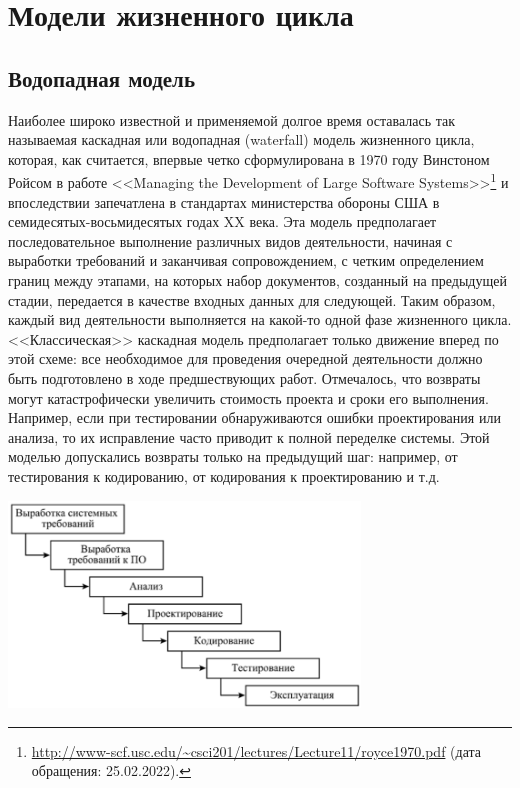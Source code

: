 \documentclass{../../text-style}
\begin{document}
\section{Модели жизненного цикла}

\subsection{Водопадная модель}
 
Наиболее широко известной и применяемой долгое время оставалась так называемая каскадная или водопадная (waterfall) модель жизненного цикла, которая, как считается, впервые четко сформулирована в 1970 году Винстоном Ройсом в работе <<Managing the Development of Large Software Systems>>\footnote{\url{http://www-scf.usc.edu/~csci201/lectures/Lecture11/royce1970.pdf} (дата обращения: 25.02.2022).} и впоследствии запечатлена в стандартах министерства обороны США в семидесятых-восьмидесятых годах XX века. Эта модель предполагает последовательное выполнение различных видов деятельности, начиная с выработки требований и заканчивая сопровождением, с четким определением границ между этапами, на которых набор документов, созданный на предыдущей стадии, передается в качестве входных данных для следующей. Таким образом, каждый вид деятельности выполняется на какой-то одной фазе жизненного цикла. <<Классическая>> каскадная модель предполагает только движение вперед по этой схеме: все необходимое для проведения очередной деятельности должно быть подготовлено в ходе предшествующих работ. Отмечалось, что возвраты могут катастрофически увеличить стоимость проекта и сроки его выполнения. Например, если при тестировании обнаруживаются ошибки проектирования или анализа, то их исправление часто приводит к полной переделке системы. Этой моделью допускались возвраты только на предыдущий шаг: например, от тестирования к кодированию, от кодирования к проектированию и т.д.

\begin{center}
    \includegraphics[width=0.7\textwidth]{waterfall.png}
\end{center}
\end{document}
